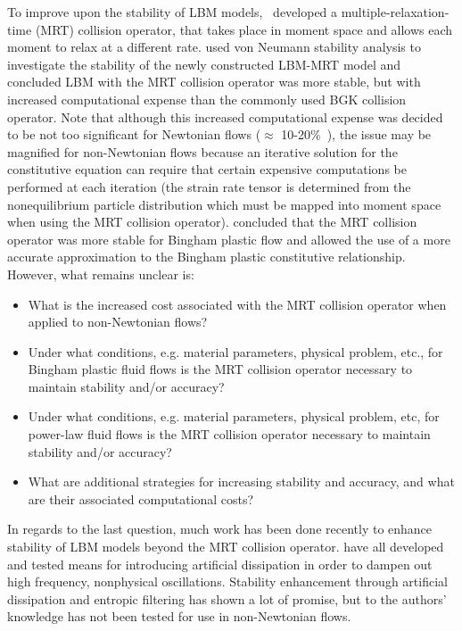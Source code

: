 \documentclass[pdftex,ms]{pittetd}
\begin{document}
To improve upon the stability of LBM models,~\citet{d1994generalized} developed a multiple-relaxation-time (MRT) collision operator, that takes place in moment space and allows each moment to relax at a different rate.
\citet{lallemand2000theory} used von Neumann stability analysis to investigate the stability of the newly constructed LBM-MRT model and concluded LBM with the MRT collision operator was more stable, but with increased computational expense than the commonly used BGK collision operator.
Note that although this increased computational expense was decided to be not too significant for Newtonian flows ($\approx$ 10-20\%~\cite{lallemand2000theory}), the issue may be magnified for non-Newtonian flows because an iterative solution for the constitutive equation can require that certain expensive computations be performed at each iteration (the strain rate tensor is determined from the nonequilibrium particle distribution which must be mapped into moment space when using the MRT collision operator).
\citeauthor{chen2014simulations} concluded that the MRT collision operator was more stable for Bingham plastic flow and allowed the use of a more accurate approximation to the Bingham plastic constitutive relationship.
However, what remains unclear is:
\begin{itemize}
    \item What is the increased cost associated with the MRT collision operator when applied to non-Newtonian flows?
    \item Under what conditions, e.g. material parameters, physical problem, etc., for Bingham plastic fluid flows is the MRT collision operator necessary to maintain stability and/or accuracy?
    \item Under what conditions, e.g. material parameters, physical problem, etc, for power-law fluid flows is the MRT collision operator necessary to maintain stability and/or accuracy?
    \item What are additional strategies for increasing stability and accuracy, and what are their associated computational costs?
\end{itemize}
In regards to the last question, much work has been done recently to enhance stability of LBM models beyond the MRT collision operator.
\citet{brownlee2006stabilization,brownlee2007stability,brownlee2008nonequilibrium,packwood2009entropy,gorban2014enhancement} have all developed and tested means for introducing artificial dissipation in order to dampen out high frequency, nonphysical oscillations.
Stability enhancement through artificial dissipation and entropic filtering has shown a lot of promise, but to the authors' knowledge has not been tested for use in non-Newtonian flows.
\end{document}

